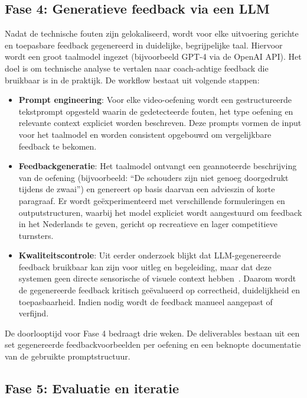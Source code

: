 \subsection{Fase 4: Generatieve feedback via een LLM}

Nadat de technische fouten zijn gelokaliseerd, wordt voor elke uitvoering gerichte en toepasbare feedback gegenereerd in duidelijke, begrijpelijke taal. Hiervoor wordt een groot taalmodel ingezet (bijvoorbeeld GPT-4 via de OpenAI API). Het doel is om technische analyse te vertalen naar coach-achtige feedback die bruikbaar is in de praktijk. De workflow bestaat uit volgende stappen:

\begin{itemize}
    \item \textbf{Prompt engineering}: Voor elke video-oef\-en\-ing wordt een gestructureerde tekst\-prompt opgesteld waarin de gedetecteerde fouten, het type oefening en relevante context expliciet worden beschreven. Deze prompts vormen de input voor het taalmodel en worden consistent opgebouwd om vergelijkbare feedback te bekomen.
    \item \textbf{Feedbackgeneratie}: Het taalmodel ontvangt een geannoteerde beschrijving van de oefening (bijvoorbeeld: ``De schouders zijn niet genoeg doorgedrukt tijdens de zwaai'') en genereert op basis daarvan een advieszin of korte paragraaf. Er wordt geëxperimenteerd met verschillende formuleringen en outputstructuren, waarbij het model expliciet wordt aangestuurd om feedback in het Nederlands te geven, gericht op recreatieve en lager competitieve turnsters.
    \item \textbf{Kwaliteitscontrole}: Uit eerder onderzoek blijkt dat LLM-gegenereerde feedback bruikbaar kan zijn voor uitleg en begeleiding, maar dat deze systemen geen directe sensorische of visuele context hebben~\autocite{Lee2025}. Daarom wordt de gegenereerde feedback kritisch geëvalueerd op correctheid, duidelijkheid en toepasbaarheid. Indien nodig wordt de feedback manueel aangepast of verfijnd.
\end{itemize}

De doorlooptijd voor Fase 4 bedraagt drie weken. De deliverables bestaan uit een set gegenereerde feedbackvoorbeelden per oefening en een beknopte documentatie van de gebruikte promptstructuur.

\subsection{Fase 5: Evaluatie en iteratie}

